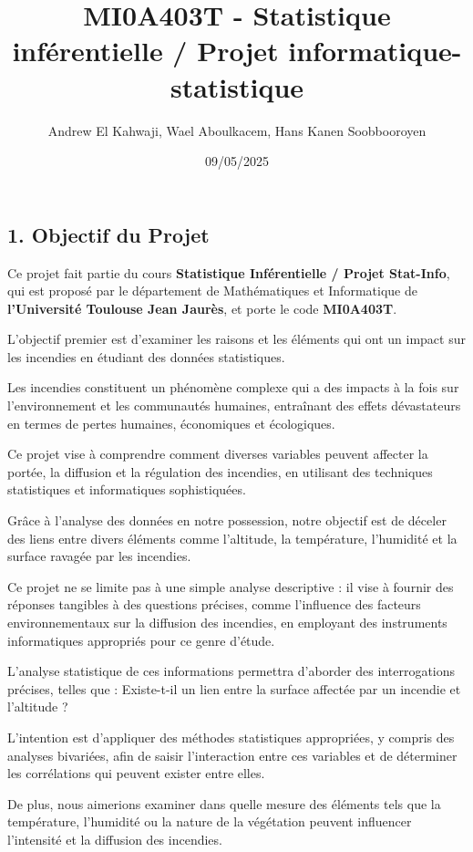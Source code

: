 \documentclass[
]{article}
\title{MI0A403T - Statistique inférentielle / Projet
informatique-statistique}
\author{Andrew El Kahwaji, Wael Aboulkacem, Hans Kanen Soobbooroyen}
\date{09/05/2025}
\begin{document}
\maketitle

{
\setcounter{tocdepth}{6}
\tableofcontents
}
\subsection{1. Objectif du Projet}\label{objectif-du-projet}

Ce projet fait partie du cours \textbf{Statistique Inférentielle /
Projet Stat-Info}, qui est proposé par le département de Mathématiques
et Informatique de \textbf{l'Université Toulouse Jean Jaurès}, et porte
le code \textbf{MI0A403T}.

L'objectif premier est d'examiner les raisons et les éléments qui ont un
impact sur les incendies en étudiant des données statistiques.

Les incendies constituent un phénomène complexe qui a des impacts à la
fois sur l'environnement et les communautés humaines, entraînant des
effets dévastateurs en termes de pertes humaines, économiques et
écologiques.

Ce projet vise à comprendre comment diverses variables peuvent affecter
la portée, la diffusion et la régulation des incendies, en utilisant des
techniques statistiques et informatiques sophistiquées.

Grâce à l'analyse des données en notre possession, notre objectif est de
déceler des liens entre divers éléments comme l'altitude, la
température, l'humidité et la surface ravagée par les incendies.

Ce projet ne se limite pas à une simple analyse descriptive : il vise à
fournir des réponses tangibles à des questions précises, comme
l'influence des facteurs environnementaux sur la diffusion des
incendies, en employant des instruments informatiques appropriés pour ce
genre d'étude.

L'analyse statistique de ces informations permettra d'aborder des
interrogations précises, telles que : Existe-t-il un lien entre la
surface affectée par un incendie et l'altitude ?

L'intention est d'appliquer des méthodes statistiques appropriées, y
compris des analyses bivariées, afin de saisir l'interaction entre ces
variables et de déterminer les corrélations qui peuvent exister entre
elles.

De plus, nous aimerions examiner dans quelle mesure des éléments tels
que la température, l'humidité ou la nature de la végétation peuvent
influencer l'intensité et la diffusion des incendies.
\end{document}
